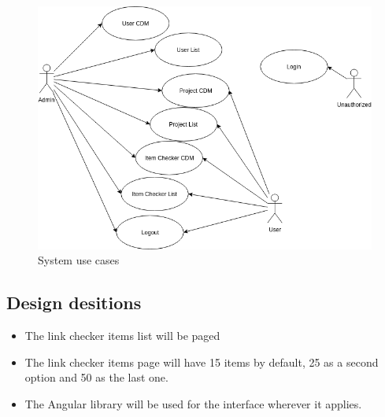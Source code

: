 \begin{figure}[ht!]
	\includegraphics[width=\textwidth]{images/Use-Cases-Linkchecker}
	\caption{System use cases}
\end{figure}

\subsection{Design desitions}
\begin{itemize}
	\item The link checker items list will be paged
	\item The link checker items page will have 15 items by default, 25 as a second option and 50 as the last one.
	\item The Angular library will be used for the interface wherever it applies.
\end{itemize}